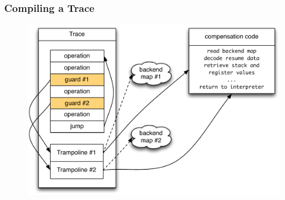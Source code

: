 \documentclass[utf8x]{beamer}
\begin{document}
\begin{frame}
  \frametitle{Compiling a Trace}
  \begin{figure}
  \centering
  \includegraphics[width=1\textwidth]{figures/loop.pdf}
  \end{figure}
\end{frame}
\end{document}
